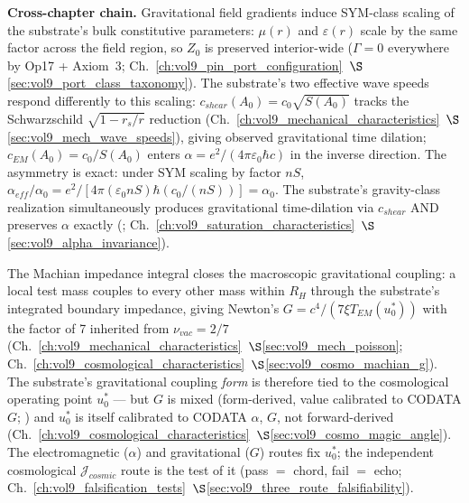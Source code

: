 \textbf{Cross-chapter chain.} Gravitational field gradients induce SYM-class scaling of the substrate's bulk constitutive parameters: $\mu(r)$ and $\varepsilon(r)$ scale by the same factor across the field region, so $Z_0$ is preserved interior-wide ($\Gamma = 0$ everywhere by Op17 + Axiom~3; Ch.~\ref{ch:vol9_pin_port_configuration}~$\S$\ref{sec:vol9_port_class_taxonomy}). The substrate's two effective wave speeds respond differently to this scaling: $c_{shear}(A_0) = c_0 \sqrt{S(A_0)}$ tracks the Schwarzschild $\sqrt{1 - r_s/r}$ reduction (Ch.~\ref{ch:vol9_mechanical_characteristics}~$\S$\ref{sec:vol9_mech_wave_speeds}), giving observed gravitational time dilation; $c_{EM}(A_0) = c_0/S(A_0)$ enters $\alpha = e^2/(4\pi\varepsilon_0\hbar c)$ in the inverse direction. The asymmetry is exact: under SYM scaling by factor $nS$, $\alpha_{eff}/\alpha_0 = e^2/[4\pi(\varepsilon_0 nS)\hbar(c_0/(nS))] = \alpha_0$. The substrate's gravity-class realization simultaneously produces gravitational time-dilation via $c_{shear}$ AND preserves $\alpha$ exactly (; Ch.~\ref{ch:vol9_saturation_characteristics}~$\S$\ref{sec:vol9_alpha_invariance}).

The Machian impedance integral closes the macroscopic gravitational coupling: a local test mass couples to every other mass within $R_H$ through the substrate's integrated boundary impedance, giving Newton's $G = c^4/(7 \xi T_{EM}(u_0^*))$ with the factor of 7 inherited from $\nu_{vac} = 2/7$ (Ch.~\ref{ch:vol9_mechanical_characteristics}~$\S$\ref{sec:vol9_mech_poisson}; Ch.~\ref{ch:vol9_cosmological_characteristics}~$\S$\ref{sec:vol9_cosmo_machian_g}). The substrate's gravitational coupling \emph{form} is therefore tied to the cosmological operating point $u_0^*$ --- but $G$ is mixed (form-derived, value calibrated to CODATA $G$; ) and $u_0^*$ is itself calibrated to CODATA $\alpha$, $G$, not forward-derived (Ch.~\ref{ch:vol9_cosmological_characteristics}~$\S$\ref{sec:vol9_cosmo_magic_angle}). The electromagnetic ($\alpha$) and gravitational ($G$) routes fix $u_0^*$; the independent cosmological $\mathcal{J}_{cosmic}$ route is the test of it (pass $=$ chord, fail $=$ echo; Ch.~\ref{ch:vol9_falsification_tests}~$\S$\ref{sec:vol9_three_route_falsifiability}).

